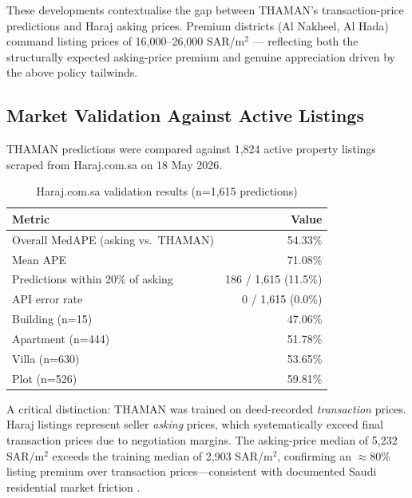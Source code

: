 \documentclass[11pt, a4paper, twoside]{article}
\begin{document}
These developments contextualise the gap between THAMAN's
transaction-price predictions and Haraj asking prices. Premium districts
(Al Nakheel, Al Hada) command listing prices of 16,000--26,000
SAR/m$^2$ --- reflecting both the structurally expected asking-price
premium and genuine appreciation driven by the above policy tailwinds.

\subsection{Market Validation Against Active Listings}
THAMAN predictions were compared against 1,824 active property listings
scraped from Haraj.com.sa on 18 May 2026.

\begin{table}[H]
  \centering
  \caption{Haraj.com.sa validation results (n=1,615 predictions)}
  \label{tab:haraj_validation}
  \begin{tabular}{lr}
    \toprule
    Metric & Value \\
    \midrule
    Overall MedAPE (asking vs.\ THAMAN) & 54.33\% \\
    Mean APE & 71.08\% \\
    Predictions within 20\% of asking & 186 / 1,615 (11.5\%) \\
    API error rate & 0 / 1,615 (0.0\%) \\
    \midrule
    Building (n=15)   & 47.06\% \\
    Apartment (n=444) & 51.78\% \\
    Villa (n=630)     & 53.65\% \\
    Plot (n=526)      & 59.81\% \\
    \bottomrule
  \end{tabular}
\end{table}

A critical distinction: THAMAN was trained on deed-recorded \emph{transaction}
prices. Haraj listings represent seller \emph{asking} prices, which
systematically exceed final transaction prices due to negotiation margins.
The asking-price median of 5,232 SAR/m$^2$ exceeds the training median of
2,903 SAR/m$^2$, confirming an $\approx 80\%$ listing premium over transaction
prices---consistent with documented Saudi residential market friction
\cite{alotaibi2021,cbre2024}.
\end{document}

